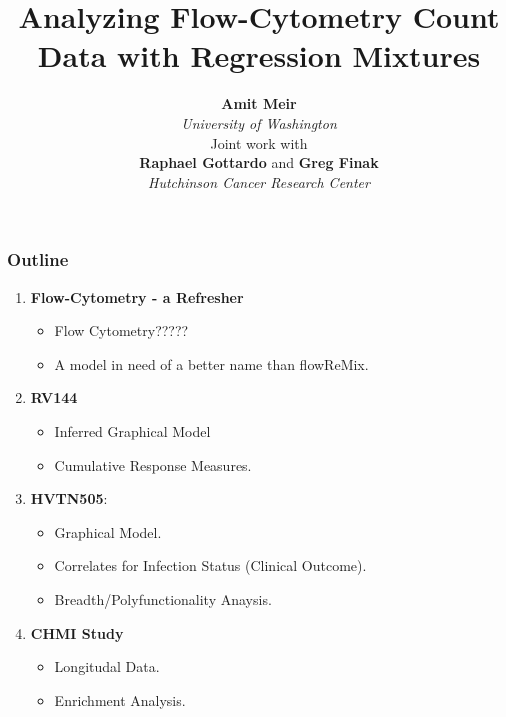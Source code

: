 \documentclass{beamer}
\theoremstyle{definition}
\begin{document}
\title{\LARGE{Analyzing Flow-Cytometry Count Data with Regression Mixtures}}

\author{\large{\textbf{Amit Meir}} \\ \emph{University of Washington} \\ \vspace{1 cm} Joint work with \\ \vspace{0.1 cm} \textbf{Raphael Gottardo} and \textbf{Greg Finak} 
\\ \emph{Hutchinson Cancer Research Center}}


\vspace{1 cm}


\begin{frame}[plain]
  \titlepage
\end{frame}



\begin{frame}
\frametitle{Outline}
\begin{enumerate}
\item \textbf{Flow-Cytometry - a Refresher}
	\begin{itemize}
	\item Flow Cytometry?????
	\item A model in need of a better name than flowReMix.
	\end{itemize}
\vspace{0.3 cm}
\item \textbf{RV144}
	\begin{itemize}
	\item Inferred Graphical Model
	\item Cumulative Response Measures.
	\end{itemize}
\vspace{0.3 cm}
\item \textbf{HVTN505}:
	\begin{itemize}
	\item Graphical Model.
	\item Correlates for Infection Status (Clinical Outcome).
	\item Breadth/Polyfunctionality Anaysis.
	\end{itemize}
	\vspace{0.3 cm}
\item \textbf{CHMI Study}
	\begin{itemize}
	\item Longitudal Data.
	\item Enrichment Analysis.
	\end{itemize}
\end{enumerate}
\end{frame}
\end{document}
